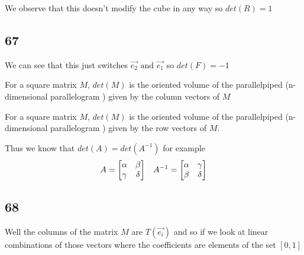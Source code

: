 \documentclass[11pt]{book}
\begin{document}
We observe that this doesn't modify the cube in any way so $\mathit{det} \left(R\right) = 1$ 


\subsection{67}%
\label{sub:67}

We can see that this just switches $\vec{e_2} \text{ and } \vec{e_1} $ so $\mathit{det} \left(F\right) = -1$ 


\begin{thm}\label{thm:volume_theorem_i}
    For a square matrix $M$, $\mathit{det} \left(M\right) $ is the oriented volume of the parallelpiped (n-dimensional parallelogram ) given by the column vectors of $M$  
\end{thm}

\begin{thm}\label{thm:volume_theorem_ii}
    For a square matrix $M$,  $\mathit{det} \left(M\right) $ is the oriented volume of the parallelpiped (n-dimensional parallelogram ) given by the row vectors  of $M$.   
\end{thm}

\begin{eg}
    Thus we know that $\mathit{det} \left(A\right) = \mathit{det} \left(A^{-1} \right) $ for example 
    \begin{align*}
        A= \begin{bmatrix} \alpha  & \beta  \\ \gamma  & \delta  \end{bmatrix} && A^{-1} = \begin{bmatrix} \alpha  & \gamma  \\ \beta  & \delta  \end{bmatrix} 
    \end{align*}
    
\end{eg}

\subsection{68}%
\label{sub:68}

Well the columns of the matrix $M$ are $T\left(\vec{e_{i} } \right) $ and so if we look at linear combinations of those vectors where the coefficients are elements of the set $\left[ 0,1 \right] $ 

\end{document}
